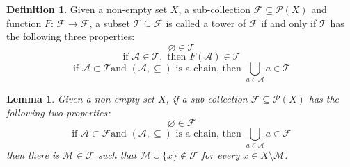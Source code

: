 \documentclass[12pt]{amsart}
\numberwithin{equation}{section}
\theoremstyle{plain} %
\newtheorem{lemma}[equation]{Lemma}
\theoremstyle{definition}
\newtheorem{definition}[equation]{Definition}
\theoremstyle{remark}
\begin{document}
\begin{definition}
Given a non-empty set $X$, a sub-collection $\mathcal{F} \subseteq \mathcal{P}(X)$ and \hyperref[definition:B_star]{function $F$}: $\mathcal{F} \to \mathcal{F}$, a subset  $\mathcal{T} \subseteq \mathcal{F}$ is called a tower of $\mathcal{F}$ if and only if $\mathcal{T}$ has the following three properties: \label{definition:tower}
	\begin{equation*}
	    \varnothing \in \mathcal{T} \tag{3.3.1}\label{definition:3.3.1}
	\end{equation*}
	\begin{equation*}
	   \text{if }\mathcal{A} \in \mathcal{T}, \text{ then } F(\mathcal{A}) \in \mathcal{T} \tag{3.3.2}\label{definition:3.3.2}
	\end{equation*}
	\begin{equation*}
	    \text{if }\mathcal{A} \subset \mathcal{T} \text{and } (\mathcal{A}, \subseteq) \text{ is a chain, then } \bigcup_{a \in \mathcal{A}}a \in \mathcal{T} \tag{3.3.3}\label{definition:3.3.3}
	\end{equation*}
\end{definition}

\begin{lemma}
Given a non-empty set $X$, if a sub-collection $\mathcal{F} \subseteq \mathcal{P}(X)$ has the following two properties: \label{lemma:FF}
	\begin{equation*}
	    \varnothing \in \mathcal{F} \tag{3.4.1}\label{lemma:3.4.1}
	\end{equation*}
	\begin{equation*}
	    \text{if }\mathcal{A} \subset \mathcal{F} \text{and } (\mathcal{A}, \subseteq) \text{ is a chain, then } \bigcup_{a \in \mathcal{A}}a \in \mathcal{F} \tag{3.4.2}\label{lemma:3.4.2}
	\end{equation*}
then there is $\mathcal{M} \in \mathcal{F}$ such that $\mathcal{M} \cup \{x\} \notin \mathcal{F}$  for every $x \in X \setminus \mathcal{M}$. 
\end{lemma}
\end{document}
